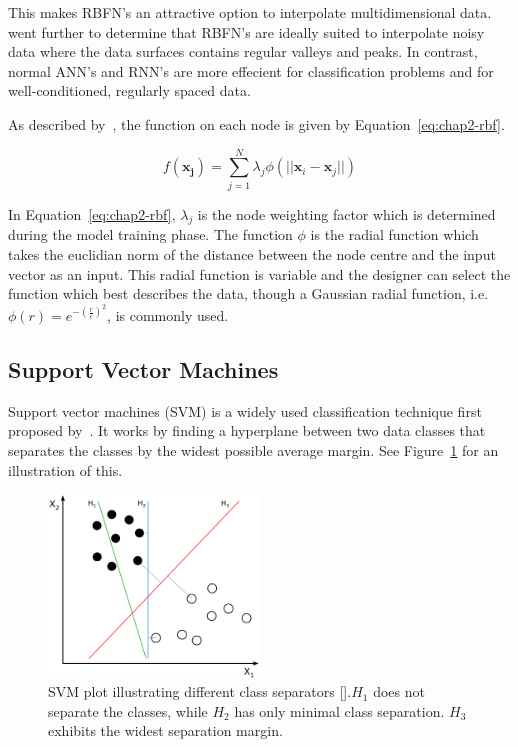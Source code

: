 This makes RBFN's an attractive option to interpolate multidimensional data.~\citeauthor{xie2011comparison} went further to determine that RBFN's are ideally suited to interpolate noisy data where the data surfaces contains regular valleys and peaks. In contrast, normal ANN's and RNN's are more effecient for classification problems and for well-conditioned, regularly spaced data. 

As described by~\cite{skala2012radial}, the function on each node is given by Equation~\ref{eq:chap2-rbf}.

\begin{equation}
  \label{eq:chap2-rbf}
  f(\bm{x_j}) = \sum\limits_{j = 1}^{N}\lambda_j \phi(|| \bm{x}_i - \bm{x}_j ||)
\end{equation}

In Equation~\ref{eq:chap2-rbf}, $\lambda_j$ is the node weighting factor which is determined during the model training phase. The function $\phi$ is the radial function which takes the euclidian norm of the distance between the node centre and the input vector as an input. This radial function is variable and the designer can select the function which best describes the data, though a Gaussian radial function, i.e.\ $\phi(r) = e^{-(\frac{r}{\epsilon})^2}$, is commonly used.  

\subsection{Support Vector Machines}

Support vector machines (SVM) is a widely used classification technique first proposed by~\cite{vapnik1995support}. It works by finding a hyperplane between two data classes that separates the classes by the widest possible average margin. See Figure~\ref{fig:chap2-svm-linear} for an illustration of this.

\begin{figure}
  \centering
  \includegraphics[width=0.5\textwidth]{figures/chapter2/svm_linear}
  \caption[SVM with linear hyperplane.]{SVM plot illustrating different class separators [\cite{svm-wiki-pic}].\@$H_1$ does not separate the classes, while $H_2$ has only minimal class separation. $H_3$ exhibits the widest separation margin.}
\label{fig:chap2-svm-linear}
\end{figure}


